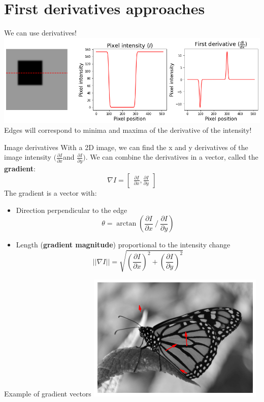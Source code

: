 \documentclass[9pt, aspectratio=169]{beamer}
\begin{document}
\section{First derivatives approaches}

\begin{frame}
    {We can use derivatives!}
    \includegraphics[width=\textwidth]{intensity_derivative.png}
    Edges will correspond to minima and maxima of the derivative of the intensity!
\end{frame}

\begin{frame}
    {Image derivatives}
    With a 2D image, we can find the x and y derivatives of the image intensity \huge$(\frac{\partial I}{\partial x} $\normalsize and \huge$\frac{\partial I}{\partial y})$.
    \normalsize
    We can combine the derivatives in a vector, called the \textbf{gradient}:
    \huge{
        $$\nabla I = \begin{bmatrix}\frac{\partial I}{\partial x}, \frac{\partial I}{\partial y}\end{bmatrix}$$}
    \pause
    \normalsize
    The gradient is a vector with:
    \begin{itemize}
        \item Direction perpendicular to the edge
              \Large{
                  $$\theta = \arctan\left(\frac{\partial I}{\partial x} \mathbin{/} \frac{\partial I}{\partial y}\right)$$}
              \pause
              \normalsize
        \item Length (\textbf{gradient magnitude}) proportional to the intensity change
              \Large{
                  $$\lvert\lvert\nabla I\rvert\rvert = \sqrt{\left(\frac{\partial I}{\partial x}\right)^2 + \left(\frac{\partial I}{\partial y}\right)^2}$$}
    \end{itemize}
\end{frame}

\begin{frame}
    {Example of gradient vectors}
    \centering
    \includegraphics[width=.7\textwidth]{monarch_gradient.png}
\end{frame}
\end{document}
